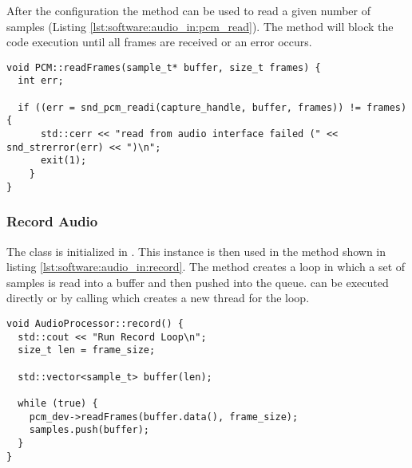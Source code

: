 %
After the configuration the method  can be used to read a given number of samples (Listing \ref{lst:software:audio_in:pcm_read}). The method will block the code execution until all frames are received or an error occurs.
%
\begin{mdframed}
\begin{lstlisting}[caption=Method for reading frames from an ALSA device, label=lst:software:audio_in:pcm_read]
void PCM::readFrames(sample_t* buffer, size_t frames) {
  int err;

  if ((err = snd_pcm_readi(capture_handle, buffer, frames)) != frames) {
      std::cerr << "read from audio interface failed (" << snd_strerror(err) << ")\n";
      exit(1);
    }
}
  \end{lstlisting}
\end{mdframed}
%
\subsubsection*{Record Audio}
%
The  class is initialized in . This instance is then used in the method  shown in listing \ref{lst:software:audio_in:record}. The method creates a loop in which a set of samples is read into a buffer and then pushed into the  queue.  can be executed directly or by calling  which creates a new thread for the loop.

\begin{mdframed}
\begin{lstlisting}[caption=Record loop, label=lst:software:audio_in:record]
void AudioProcessor::record() {
  std::cout << "Run Record Loop\n";
  size_t len = frame_size;

  std::vector<sample_t> buffer(len);

  while (true) {
    pcm_dev->readFrames(buffer.data(), frame_size);
    samples.push(buffer);
  }
}
\end{lstlisting}
\end{mdframed}